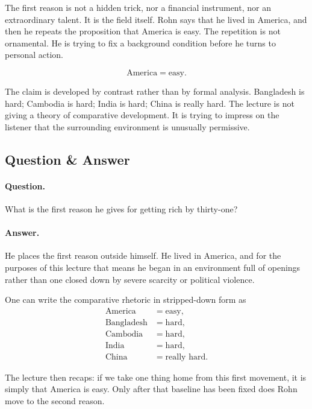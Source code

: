 The first reason is not a hidden trick, nor a financial instrument, nor an extraordinary talent. It is the field itself. Rohn says that he lived in America, and then he repeats the proposition that America is easy. The repetition is not ornamental. He is trying to fix a background condition before he turns to personal action.

\begin{equation}
\text{America}=\text{easy}.
\end{equation}

The claim is developed by contrast rather than by formal analysis. Bangladesh is hard; Cambodia is hard; India is hard; China is really hard. The lecture is not giving a theory of comparative development. It is trying to impress on the listener that the surrounding environment is unusually permissive.

\subsection{Question \& Answer}

\paragraph{Question.} What is the first reason he gives for getting rich by thirty-one?

\paragraph{Answer.} He places the first reason outside himself. He lived in America, and for the purposes of this lecture that means he began in an environment full of openings rather than one closed down by severe scarcity or political violence.

One can write the comparative rhetoric in stripped-down form as
\begin{align}
\text{America} &= \text{easy},\\
\text{Bangladesh} &= \text{hard},\\
\text{Cambodia} &= \text{hard},\\
\text{India} &= \text{hard},\\
\text{China} &= \text{really hard}.
\end{align}

The lecture then recaps: if we take one thing home from this first movement, it is simply that America is easy. Only after that baseline has been fixed does Rohn move to the second reason.

